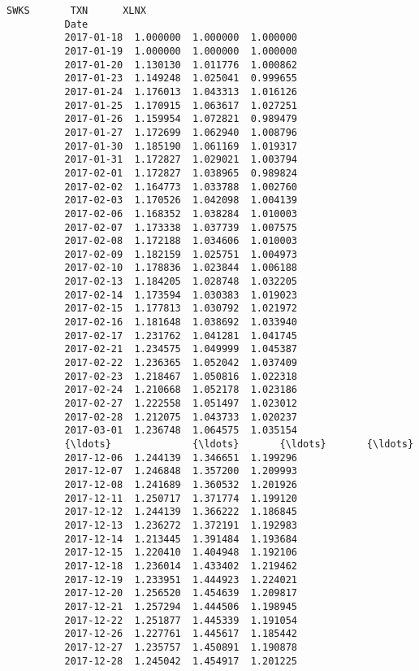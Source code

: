 \documentclass[11pt]{article}
\begin{document}
\begin{Verbatim}[commandchars=\\\{\}]
                          SWKS       TXN      XLNX  
          Date                                      
          2017-01-18  1.000000  1.000000  1.000000  
          2017-01-19  1.000000  1.000000  1.000000  
          2017-01-20  1.130130  1.011776  1.000862  
          2017-01-23  1.149248  1.025041  0.999655  
          2017-01-24  1.176013  1.043313  1.016126  
          2017-01-25  1.170915  1.063617  1.027251  
          2017-01-26  1.159954  1.072821  0.989479  
          2017-01-27  1.172699  1.062940  1.008796  
          2017-01-30  1.185190  1.061169  1.019317  
          2017-01-31  1.172827  1.029021  1.003794  
          2017-02-01  1.172827  1.038965  0.989824  
          2017-02-02  1.164773  1.033788  1.002760  
          2017-02-03  1.170526  1.042098  1.004139  
          2017-02-06  1.168352  1.038284  1.010003  
          2017-02-07  1.173338  1.037739  1.007575  
          2017-02-08  1.172188  1.034606  1.010003  
          2017-02-09  1.182159  1.025751  1.004973  
          2017-02-10  1.178836  1.023844  1.006188  
          2017-02-13  1.184205  1.028748  1.032205  
          2017-02-14  1.173594  1.030383  1.019023  
          2017-02-15  1.177813  1.030792  1.021972  
          2017-02-16  1.181648  1.038692  1.033940  
          2017-02-17  1.231762  1.041281  1.041745  
          2017-02-21  1.234575  1.049999  1.045387  
          2017-02-22  1.236365  1.052042  1.037409  
          2017-02-23  1.218467  1.050816  1.022318  
          2017-02-24  1.210668  1.052178  1.023186  
          2017-02-27  1.222558  1.051497  1.023012  
          2017-02-28  1.212075  1.043733  1.020237  
          2017-03-01  1.236748  1.064575  1.035154  
          {\ldots}              {\ldots}       {\ldots}       {\ldots}  
          2017-12-06  1.244139  1.346651  1.199296  
          2017-12-07  1.246848  1.357200  1.209993  
          2017-12-08  1.241689  1.360532  1.201926  
          2017-12-11  1.250717  1.371774  1.199120  
          2017-12-12  1.244139  1.366222  1.186845  
          2017-12-13  1.236272  1.372191  1.192983  
          2017-12-14  1.213445  1.391484  1.193684  
          2017-12-15  1.220410  1.404948  1.192106  
          2017-12-18  1.236014  1.433402  1.219462  
          2017-12-19  1.233951  1.444923  1.224021  
          2017-12-20  1.256520  1.454639  1.209817  
          2017-12-21  1.257294  1.444506  1.198945  
          2017-12-22  1.251877  1.445339  1.191054  
          2017-12-26  1.227761  1.445617  1.185442  
          2017-12-27  1.235757  1.450891  1.190878  
          2017-12-28  1.245042  1.454917  1.201225  

\end{Verbatim}
\end{document}
